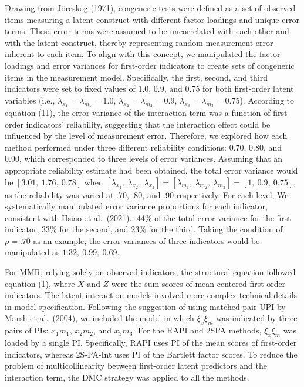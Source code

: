 \documentclass[
  man]{apa6}
\begin{document}
Drawing from Jöreskog (1971), congeneric tests were defined as a set of observed items measuring a latent construct with different factor loadings and unique error terms. These error terms were assumed to be uncorrelated with each other and with the latent construct, thereby representing random measurement error inherent to each item. To align with this concept, we manipulated the factor loadings and error variances for first-order indicators to create sets of congeneric items in the measurement model. Specifically, the first, second, and third indicators were set to fixed values of 1.0, 0.9, and 0.75 for both first-order latent variables (i.e., \(\lambda_{x_{1}} = \lambda_{m_{1}} = 1.0\), \(\lambda_{x_{2}} = \lambda_{m_{2}} = 0.9\), \(\lambda_{x_{3}} = \lambda_{m_{3}} = 0.75\)). According to equation (11), the error variance of the interaction term was a function of first-order indicators' reliability, suggesting that the interaction effect could be influenced by the level of measurement error. Therefore, we explored how each method performed under three different reliability conditions: 0.70, 0.80, and 0.90, which corresponded to three levels of error variances. Assuming that an appropriate reliability estimate had been obtained, the total error variance would be \([3.01, \ 1.76, \ 0.78]\) when \([\lambda_{x_{1}}, \ \lambda_{x_{2}}, \ \lambda_{x_{3}}] = [\lambda_{m_{1}}, \ \lambda_{m_{2}}, \ \lambda_{m_{3}}] = [1, \ 0.9, \ 0.75]\), as the reliability was varied at .70, .80, and .90 respectively. For each level, We systematically manipulated error variance proportions for each indicator, consistent with Hsiao et al.~(2021).: 44\(\%\) of the total error variance for the first indicator, 33\(\%\) for the second, and 23\(\%\) for the third. Taking the condition of \(\rho = .70\) as an example, the error variances of three indicators would be manipulated as \(1.32, \ 0.99, \ 0.69\).

For MMR, relying solely on observed indicators, the structural equation followed equation (1), where \(X\) and \(Z\) were the sum scores of mean-centered first-order indicators. The latent interaction models involved more complex technical details in model specification. Following the suggestion of using matched-pair UPI by Marsh et al.~(2004), we included the model in which \(\xi_{x}\xi_{m}\) was indicated by three pairs of PIs: \(x_{1}m_{1}\), \(x_{2}m_{2}\), and \(x_{3}m_{3}\). For the RAPI and 2SPA methods, \(\xi_{x}\xi_{m}\) was loaded by a single PI. Specifically, RAPI uses PI of the mean scores of first-order indicators, whereas 2S-PA-Int uses PI of the Bartlett factor scores. To reduce the problem of multicollinearity between first-order latent predictors and the interaction term, the DMC strategy was applied to all the methods.
\end{document}
